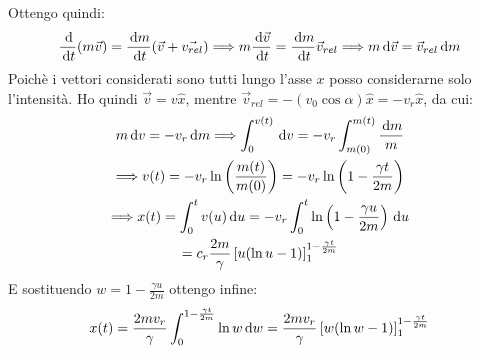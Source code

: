 \documentclass[../main.tex]{subfiles}
\begin{document}
Ottengo quindi:
\begin{equation*}
	\frac{\,\mathrm{d}}{\,\mathrm{d} t} (m\vec v)=\frac{\,\mathrm{d} m}{\,\mathrm{d} t}(\vec v+\vec{v_{rel}}) \Longrightarrow m \frac{\,\mathrm{d} \vec v}{\,\mathrm{d} t}=\frac{\,\mathrm{d} m}{\,\mathrm{d} t}\vec{v}_{rel}\Longrightarrow m\,\mathrm{d} \vec v=\vec{v}_{rel}\,\mathrm{d} m
\end{equation*}
Poichè i vettori considerati sono tutti lungo l'asse $x$ posso considerarne solo l'intensità. Ho quindi $\vec v=v\hat x$, mentre $\vec v_{rel}=-(v_0\cos\alpha)\hat x=-v_r\hat x$, da cui:
\begin{gather*}
	m\,\mathrm{d} v=-v_r\,\mathrm{d} m \Longrightarrow \int_0^{v(t)}\,\mathrm{d} v=-v_r\int_{m(0)}^{m(t)}\frac{\,\mathrm{d} m}{m}\\
	\Longrightarrow v(t)=-v_r \ln\left( \frac{m(t)}{m(0)} \right)=-v_r\ln\left( 1-\frac{\gamma t}{2m} \right) \\
	\Longrightarrow x(t)=\int_0^{t} v(u) \,\mathrm{d} u=-v_r \int_0^{t} \ln\left( 1-\frac{\gamma u}{2m} \right) \,\mathrm{d} u\\
							=c_r \frac{2m}{\gamma} \left[ u (\ln u-1) 	\right]_1^{1-\frac{\gamma t}{2m}}
\end{gather*}
E sostituendo $w= 1-\frac{\gamma u}{2m}$ ottengo infine:
\begin{gather*}
	x(t)=\frac{2m v_r}{\gamma}\int_{0}^{1-\frac{\gamma t}{2m}} \ln w \,\mathrm{d} w=\frac{2mv_r}{\gamma} \left[ w (\ln w-1) 	\right]_1^{1-\frac{\gamma t}{2m}}
\end{gather*}
\end{document}
